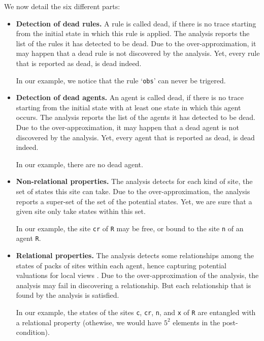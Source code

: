 \documentclass[11pt]{book}
\begin{document}
We now detail the six different parts:
\begin{itemize}
\item \textbf{Detection of dead rules.} A rule is called dead, if there is no trace starting from the initial state in which this rule is applied. The analysis reports the list of the rules it has detected to be dead. Due to the over-approximation, it may happen that a dead rule is not discovered by the analysis. Yet, every rule that is reported as dead, is dead indeed.

In our example, we notice that the rule `\texttt{obs}' can never be trigered.

\item \textbf{Detection of dead agents.} An agent is called dead, if there is no trace starting from the initial state with at least one state in which this agent occurs. The analysis reports the list of the agents it has detected to be dead. Due to the over-approximation, it may happen that a dead agent is not discovered by the analysis. Yet, every agent that is reported as dead, is dead indeed.

In our example, there are no dead agent.

\item \textbf{Non-relational properties.} The analysis detects for each kind of site, the set of states this site can take.
Due to the over-approximation, the analysis reports a super-set of the set of the potential states. Yet, we are sure that a given site only take states within this set.

In our example, the site \texttt{cr} of \texttt{R} may be free, or bound to the site \texttt{n} of an agent \texttt{R}.

\item \textbf{Relational properties.} The analysis detects some relationships among the states of packs of sites within each agent, hence capturing potential valuations for local views \cite{Feret-ICCMSE2007,DanosEtAl-VMCAI08}.
Due to the over-approximation of the analysis, the analysis may fail in discovering a relationship. But each relationship that is found by the analysis is satisfied.

In our example, the states of the sites \texttt{c}, \texttt{cr}, \texttt{n}, and \texttt{x} of \texttt{R} are entangled with a relational property (othewise, we would have $5^2$ elements in the post-condition).



\end{itemize}
\end{document}
